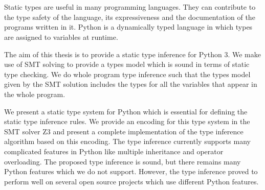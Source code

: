 \chapter{\abstractname}

Static types are useful in many programming languages. They can contribute to the type safety of the language, its expressiveness and the documentation of the programs written in it. Python is a dynamically typed language in which types are assigned to variables at runtime.

The aim of this thesis is to provide a static type inference for Python 3. We make use of SMT solving to provide a types model which is sound in terms of static type checking. We do whole program type inference such that the types model given by the SMT solution includes the types for all the variables that appear in the whole program.

We present a static type system for Python which is essential for defining the static type inference rules. We provide an encoding for this type system in the SMT solver Z3 and present a complete implementation of the type inference algorithm based on this encoding. The type inference currently supports many complicated features in Python like multiple inheritance and operator overloading. The proposed type inference is sound, but there remains many Python features which we do not support. However, the type inference proved to perform well on several open source projects which use different Python features.



